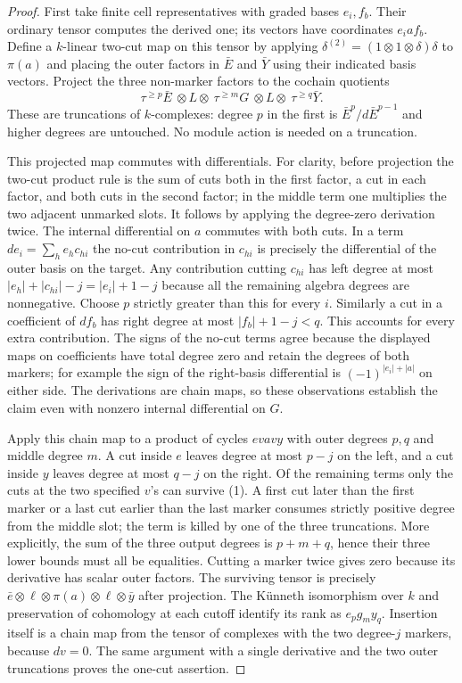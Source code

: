 \documentclass[11pt]{article}
\begin{document}
\begin{proof}
First take finite cell representatives with graded bases $e_i,f_b$.
Their ordinary tensor computes the derived one; its vectors have
coordinates $e_i a f_b$. Define a $k$-linear two-cut map on this tensor
by applying $\delta^{(2)}=(1\otimes1\otimes\delta)\delta$ to $\pi(a)$
and placing the outer factors in $\bar E$ and $\bar Y$ using their
indicated basis vectors. Project the three non-marker factors to the
cochain quotients
\[
 \tau^{\ge p}\bar E\ \otimes L\otimes\
 \tau^{\ge m}G\ \otimes L\otimes\ \tau^{\ge q}\bar Y.           \tag{1}
\]
These are truncations of $k$-complexes: degree $p$ in the first is
$\bar E^p/d\bar E^{p-1}$ and higher degrees are untouched. No module
action is needed on a truncation.

This projected map commutes with differentials. For clarity, before
projection the two-cut product rule is the sum of cuts both in the
first factor, a cut in each factor, and both cuts in the second factor;
in the middle term one multiplies the two adjacent unmarked slots.
It follows by applying the degree-zero derivation twice. The internal
differential on $a$ commutes with both cuts. In a term
$d e_i=\sum_h e_h c_{hi}$ the no-cut contribution in $c_{hi}$ is precisely
the differential of the outer basis on the target. Any contribution
cutting $c_{hi}$ has left degree at most
$|e_h|+|c_{hi}|-j=|e_i|+1-j$ because all the remaining algebra degrees
are nonnegative. Choose $p$ strictly greater than this for every $i$.
Similarly a cut in a coefficient of $df_b$ has right degree at most
$|f_b|+1-j<q$. This accounts for every extra contribution. The signs of
the no-cut terms agree because the displayed maps on coefficients have
total degree zero and retain the degrees of both markers; for example the
sign of the right-basis differential is $(-1)^{|e_i|+|a|}$ on either
side. The derivations are chain maps, so these observations establish the
claim even with nonzero internal differential on $G$.

Apply this chain map to a product of cycles $e v a v y$ with outer
degrees $p,q$ and middle degree $m$. A cut inside $e$ leaves degree
at most $p-j$ on the left, and a cut inside $y$ leaves degree at most
$q-j$ on the right. Of the remaining terms only the cuts at the two
specified $v$'s can survive (1). A first cut later than the first marker
or a last cut earlier than the last marker consumes strictly positive
degree from the middle slot; the term is killed by one of the three
truncations. More explicitly, the sum of the three output degrees is
$p+m+q$, hence their three lower bounds must all be equalities.
Cutting a marker twice gives zero because its derivative has scalar
outer factors. The surviving tensor is precisely
$\bar e\otimes\ell\otimes\pi(a)\otimes\ell\otimes\bar y$ after projection.
The Künneth isomorphism over $k$ and preservation of cohomology at each
cutoff identify its rank as $e_p g_m y_q$. Insertion itself is a chain
map from the tensor of complexes with the two degree-$j$ markers,
because $dv=0$. The same argument with a single derivative and the two
outer truncations proves the one-cut assertion.


\end{proof}
\end{document}
